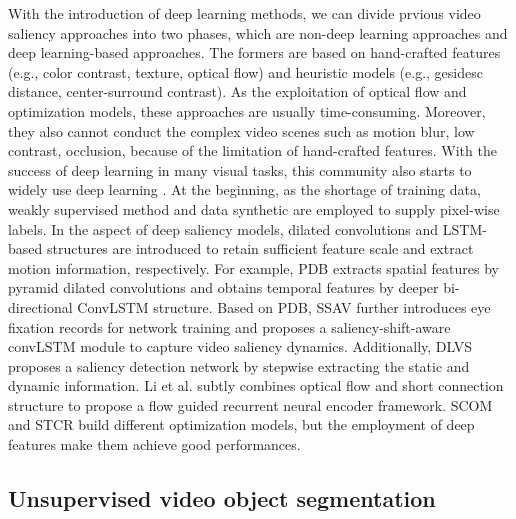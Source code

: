 \documentclass[12pt]{article}
\begin{document}
With the introduction of deep learning methods, we can divide prvious video saliency approaches into two phases, which are non-deep learning approaches and deep learning-based approaches. The formers are based on hand-crafted features (e.g., color contrast, texture, optical flow) and heuristic models (e.g., gesidesc distance, center-surround contrast). As the exploitation of optical flow and optimization models, these approaches are usually time-consuming. Moreover, they also cannot conduct the complex video scenes such as motion blur, low contrast, occlusion, because of the limitation of hand-crafted features. With the success of deep learning in many visual tasks, this community also starts to widely use deep learning \cite{A,B,C,D,F}. At the beginning, as the shortage of training data, weakly supervised method \cite{scnn} and data synthetic \cite{fcn} are employed to supply pixel-wise labels. In the aspect of deep saliency models, dilated convolutions and LSTM-based structures are introduced to retain sufficient feature scale and extract motion information, respectively. For example, PDB \cite{pdb} extracts spatial features by pyramid dilated convolutions and obtains temporal features by deeper bi-directional ConvLSTM structure. Based on PDB, SSAV \cite{ssav} further introduces eye fixation records for network training and proposes a saliency-shift-aware convLSTM module to capture video saliency dynamics. Additionally, DLVS \cite{scnn} proposes a saliency detection network by stepwise extracting the static and dynamic information. Li et al. \cite{fgrne} subtly combines optical flow and short connection structure \cite{dss} to propose a flow guided recurrent neural encoder framework. SCOM \cite{scom} and STCR \cite{scom} build different optimization models, but the employment of deep features make them achieve good performances. 

\subsection{Unsupervised video object segmentation}
\end{document}
